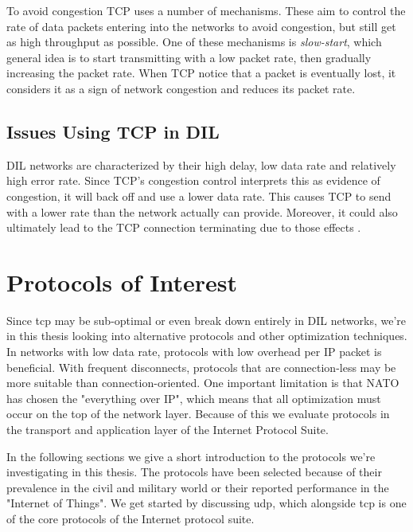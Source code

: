 To avoid congestion TCP uses a number of mechanisms. These aim to control the
rate of data packets entering into the networks to avoid congestion, but still
get as high throughput as possible. One of these mechanisms is
\textit{slow-start}, which general idea is to start transmitting with a low
packet rate, then gradually increasing the packet rate. When TCP notice that a
packet is eventually lost, it considers it as a sign of network congestion and
reduces its packet rate.

\subsection{Issues Using TCP in DIL}
\label{section:tcp-problems}

DIL networks are characterized by their high delay, low data rate and relatively
high error rate. Since TCP's congestion control interprets this as evidence of
congestion, it will back off and use a lower data rate. This causes TCP to send
with a lower rate than the network actually can provide. Moreover, it could also
ultimately lead to the TCP connection terminating due to those
effects \cite{nato-disadvantaged-grids}.


\section{Protocols of Interest}

Since \gls{tcp} may be sub-optimal or even break down entirely in DIL networks,
we're in this thesis looking into alternative protocols and other optimization
techniques. In networks with low data rate, protocols with low overhead per IP
packet is beneficial. With frequent disconnects, protocols that are
connection-less may be more suitable than connection-oriented. One important
limitation is that NATO has chosen the "everything over IP", which means that
all optimization must occur on the top of the network layer. Because of this we
evaluate protocols in the transport and application layer of the Internet
Protocol Suite.

In the following sections we give a short introduction to the protocols
we're investigating in this thesis. The protocols have been selected because of
their prevalence in the civil and military world or their reported performance
in the "Internet of Things". We get started by discussing \gls{udp}, which
alongside \gls{tcp} is one of the core protocols of the Internet protocol suite.


\subsection{}

